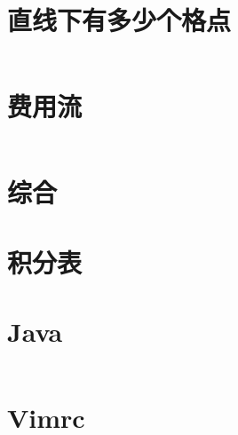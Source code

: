 \documentclass[titlepage,landscape,a4paper,10pt]{article}
\begin{document}
\begin{multicols}{2}
\begin{spacing}{0.8}
\section{直线下有多少个格点}
\inputminted{cpp}{src/直线下格点统计.cpp}

\section{费用流}
\inputminted{cpp}{improve/MincostFlow.cpp}

\section{综合}






\end{spacing}
\end{multicols}
\section{积分表}



\begin{multicols}{2}
\begin{spacing}{0.8}


\section{Java}
\inputminted{java}{src/Main.java}

\section{Vimrc}
\inputminted{text}{src/vimrc.vim}
\end{spacing}

\end{multicols}
\end{document}
